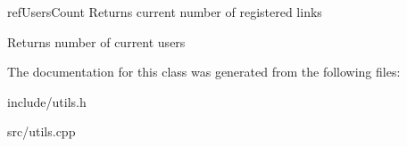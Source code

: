 ref\+Users\+Count Returns current number of registered links 

\begin{DoxyReturn}{Returns}
number of current users 
\end{DoxyReturn}


The documentation for this class was generated from the following files\+:\begin{DoxyCompactItemize}
\item 
include/utils.\+h\item 
src/utils.\+cpp\end{DoxyCompactItemize}
